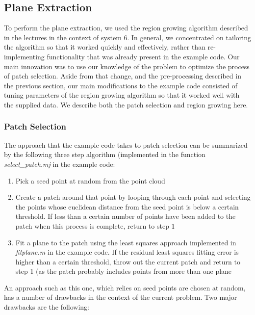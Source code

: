 \subsection{Plane Extraction}

To perform the plane extraction, we used the region growing algorithm described in the lectures in the context of system 6. In general, we concentrated on tailoring the algorithm so that it worked quickly and effectively, rather than re-implementing functionality that was already present in the example code. Our main innovation was to use our knowledge of the problem to optimize the process of patch selection. Aside from that change, and the pre-processing described in the previous section, our main modifications to the example code consisted of tuning parameters of the region growing algorithm so that it worked well with the supplied data. We describe both the patch selection and region growing here.

\subsubsection{Patch Selection}

The approach that the example code takes to patch selection can be summarized by the following three step algorithm (implemented in the function \emph{select\_patch.mj} in the example code:

\begin{enumerate}
	\item Pick a seed point at random from the point cloud
	\item Create a patch around that point by looping through each point and selecting the points whose euclidean distance from the seed point is below a certain threshold. If less than a certain number of points have been added to the patch when this process is complete, return to step 1
	\item Fit a plane to the patch using the least squares approach implemented in \emph{fitplane.m} in the example code. If the residual least squares fitting error is higher than a certain threshold, throw out the current patch and return to step 1 (as the patch probably includes points from more than one plane
\end{enumerate}

An approach such as this one, which relies on seed points are chosen at random, has a number of drawbacks in the context of the current problem. Two major drawbacks are the following:

